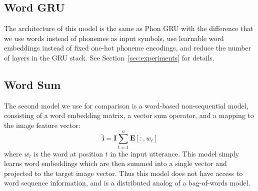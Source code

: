 \subsection{Word GRU}
The architecture of this model is the same as {\sc Phon GRU} with
the difference that we use words instead of phonemes as input symbols,
use learnable word embeddings instead of fixed one-hot phoneme
encodings, and reduce the number of layers in the GRU stack. See
Section~\ref{sec:experiments} for details.
\subsection{Word Sum}
The second model we use for comparison is a word-based non-sequential
model, consisting of a word embedding matrix, a vector sum operator,
and a mapping to the image feature vector:
\begin{equation}
  \label{eq:sum}
  \hat{\mathbf{i}} = \mathbf{I} \sum_{t=1}^n \mathbf{E}[:,w_t]
\end{equation}
where $w_t$ is the word at position $t$ in the input utterance.
This model simply learns word embeddings which are then summed into a
single vector and projected to the target image vector. Thus this model does
not have access to word sequence information, and is a distributed
analog of a bag-of-words model.
